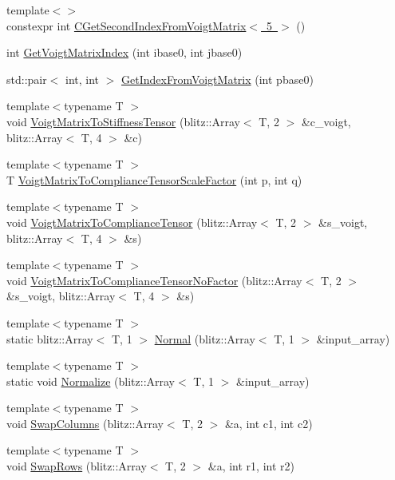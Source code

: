 \begin{DoxyCompactItemize}
\item 
{\footnotesize template$<$$>$ }\\constexpr int \mbox{\hyperlink{namespacempc_1_1utilities_a070e4f2163645cfbe7e03651d594016e}{C\+Get\+Second\+Index\+From\+Voigt\+Matrix$<$ 5 $>$}} ()
\item 
int \mbox{\hyperlink{namespacempc_1_1utilities_ab6036c49506f59bdc9d5e522df98f24a}{Get\+Voigt\+Matrix\+Index}} (int ibase0, int jbase0)
\item 
std\+::pair$<$ int, int $>$ \mbox{\hyperlink{namespacempc_1_1utilities_a3068edcfc9812e8161b332a659ededaa}{Get\+Index\+From\+Voigt\+Matrix}} (int pbase0)
\item 
{\footnotesize template$<$typename T $>$ }\\void \mbox{\hyperlink{namespacempc_1_1utilities_ad181e7080d74d1e523e872bc8ff53f5e}{Voigt\+Matrix\+To\+Stiffness\+Tensor}} (blitz\+::\+Array$<$ T, 2 $>$ \&c\+\_\+voigt, blitz\+::\+Array$<$ T, 4 $>$ \&c)
\item 
{\footnotesize template$<$typename T $>$ }\\T \mbox{\hyperlink{namespacempc_1_1utilities_afd7cbb4c9bcff1896e7151eae95369ae}{Voigt\+Matrix\+To\+Compliance\+Tensor\+Scale\+Factor}} (int p, int q)
\item 
{\footnotesize template$<$typename T $>$ }\\void \mbox{\hyperlink{namespacempc_1_1utilities_a14f790d9a892452ed500ba8d7caf0222}{Voigt\+Matrix\+To\+Compliance\+Tensor}} (blitz\+::\+Array$<$ T, 2 $>$ \&s\+\_\+voigt, blitz\+::\+Array$<$ T, 4 $>$ \&s)
\item 
{\footnotesize template$<$typename T $>$ }\\void \mbox{\hyperlink{namespacempc_1_1utilities_af0464cc342675cdd798936b674ceb8a9}{Voigt\+Matrix\+To\+Compliance\+Tensor\+No\+Factor}} (blitz\+::\+Array$<$ T, 2 $>$ \&s\+\_\+voigt, blitz\+::\+Array$<$ T, 4 $>$ \&s)
\item 
{\footnotesize template$<$typename T $>$ }\\static blitz\+::\+Array$<$ T, 1 $>$ \mbox{\hyperlink{namespacempc_1_1utilities_acc0a66ea58c515cc13d5a0a79439c639}{Normal}} (blitz\+::\+Array$<$ T, 1 $>$ \&input\+\_\+array)
\item 
{\footnotesize template$<$typename T $>$ }\\static void \mbox{\hyperlink{namespacempc_1_1utilities_a2b888b4e5d7d4fe16a1c97c120d0494f}{Normalize}} (blitz\+::\+Array$<$ T, 1 $>$ \&input\+\_\+array)
\item 
{\footnotesize template$<$typename T $>$ }\\void \mbox{\hyperlink{namespacempc_1_1utilities_a86772b476b0e0aa1567f42c8a9aa7a3c}{Swap\+Columns}} (blitz\+::\+Array$<$ T, 2 $>$ \&a, int c1, int c2)
\item 
{\footnotesize template$<$typename T $>$ }\\void \mbox{\hyperlink{namespacempc_1_1utilities_a7dc82dae028a331f955ec8a5aa3599a4}{Swap\+Rows}} (blitz\+::\+Array$<$ T, 2 $>$ \&a, int r1, int r2)
\end{DoxyCompactItemize}
